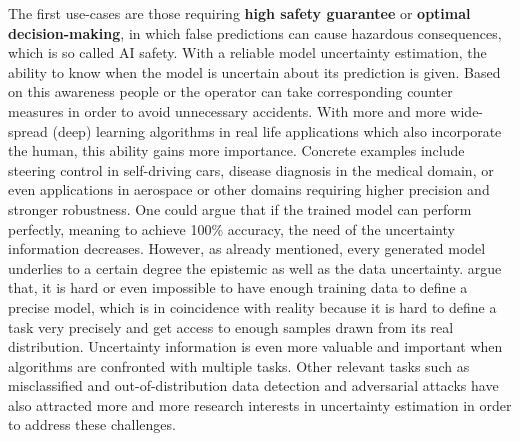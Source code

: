 The first use-cases are those requiring \textbf{high safety guarantee} or \textbf{optimal decision-making}, in which false predictions can cause hazardous consequences, which is so called AI safety\cite{amodei2016concrete}. With a reliable model uncertainty estimation, the ability to know when the model is uncertain about its prediction is given. Based on this awareness people or the operator can take corresponding counter measures in order to avoid unnecessary accidents. With more and more wide-spread (deep) learning algorithms in real life applications which also incorporate the human, this ability gains more importance. Concrete examples include steering control in self-driving cars\cite{mcallister2017concrete}, disease diagnosis in the medical domain\cite{leibig2017leveraging}, or even applications in aerospace or other domains requiring higher precision and stronger robustness. One could argue that if the trained model can perform perfectly, meaning to achieve 100\% accuracy, the need of the uncertainty information decreases. 
However, as already mentioned, every generated model underlies to a certain degree the epistemic as well as the data uncertainty.
\cite{denker1991transforming} argue that, it is hard or even impossible to have enough training data to define a precise model, which is in coincidence with reality because it is hard to define a task very precisely and get access to enough samples drawn from its real distribution. Uncertainty information is even more valuable and important when algorithms are confronted with multiple tasks\cite{kendall2017multi}. Other relevant tasks such as misclassified 
and out-of-distribution data detection\cite{hendrycks2016baseline} and adversarial attacks \cite{kurakin2016adversarial, feinman2017detecting} 
have also attracted more and more research interests in uncertainty estimation in order to address these challenges.

